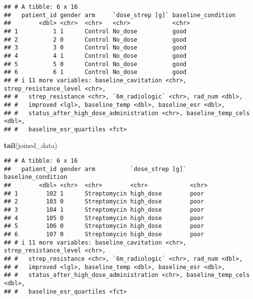 \documentclass[
]{article}
\newenvironment{Shaded}{\begin{snugshade}}{\end{snugshade}}
\newcommand{\FunctionTok}[1]{\textcolor[rgb]{0.13,0.29,0.53}{\textbf{#1}}}
\newcommand{\NormalTok}[1]{#1}
\newcommand{\OtherTok}[1]{\textcolor[rgb]{0.56,0.35,0.01}{#1}}
\newcommand{\SpecialCharTok}[1]{\textcolor[rgb]{0.81,0.36,0.00}{\textbf{#1}}}
\begin{document}
\begin{Shaded}
\end{Shaded}

\begin{verbatim}
## # A tibble: 6 x 16
##   patient_id gender arm     `dose_strep [g]` baseline_condition
##        <dbl> <chr>  <chr>   <chr>            <chr>             
## 1          1 1      Control No_dose          good              
## 2          2 0      Control No_dose          good              
## 3          3 0      Control No_dose          good              
## 4          4 1      Control No_dose          good              
## 5          5 0      Control No_dose          good              
## 6          6 1      Control No_dose          good              
## # i 11 more variables: baseline_cavitation <chr>, strep_resistance_level <chr>,
## #   strep_resistance <chr>, `6m_radiologic` <chr>, rad_num <dbl>,
## #   improved <lgl>, baseline_temp <dbl>, baseline_esr <dbl>,
## #   status_after_high_dose_administration <chr>, baseline_temp_cels <dbl>,
## #   baseline_esr_quartiles <fct>
\end{verbatim}

\begin{Shaded}
\begin{Highlighting}[]
\FunctionTok{tail}\NormalTok{(joined\_data)}
\end{Highlighting}
\end{Shaded}

\begin{verbatim}
## # A tibble: 6 x 16
##   patient_id gender arm          `dose_strep [g]` baseline_condition
##        <dbl> <chr>  <chr>        <chr>            <chr>             
## 1        102 1      Streptomycin high_dose        poor              
## 2        103 0      Streptomycin high_dose        poor              
## 3        104 1      Streptomycin high_dose        poor              
## 4        105 0      Streptomycin high_dose        poor              
## 5        106 0      Streptomycin high_dose        poor              
## 6        107 0      Streptomycin high_dose        poor              
## # i 11 more variables: baseline_cavitation <chr>, strep_resistance_level <chr>,
## #   strep_resistance <chr>, `6m_radiologic` <chr>, rad_num <dbl>,
## #   improved <lgl>, baseline_temp <dbl>, baseline_esr <dbl>,
## #   status_after_high_dose_administration <chr>, baseline_temp_cels <dbl>,
## #   baseline_esr_quartiles <fct>
\end{verbatim}
\end{document}
